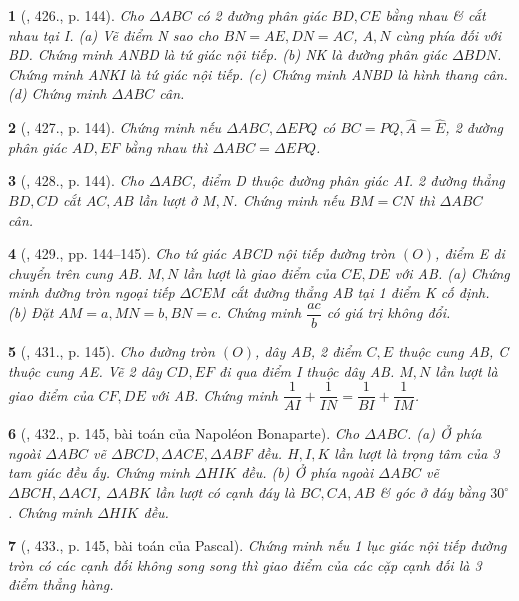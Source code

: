 \documentclass{article}
\newtheorem{baitoan}{}
\begin{document}
\begin{baitoan}[\cite{Binh_Toan_9_tap_2}, 426., p. 144]
	Cho $\Delta ABC$ có 2 đường phân giác $BD,CE$ bằng nhau \& cắt nhau tại I. (a) Vẽ điểm N sao cho $BN = AE,DN = AC$, $A,N$ cùng phía đối với BD. Chứng minh ANBD là tứ giác nội tiếp. (b) NK là đường phân giác $\Delta BDN$. Chứng minh ANKI là tứ giác nội tiếp. (c) Chứng minh ANBD là hình thang cân. (d) Chứng minh $\Delta ABC$ cân.
\end{baitoan}

\begin{baitoan}[\cite{Binh_Toan_9_tap_2}, 427., p. 144]
	Chứng minh nếu $\Delta ABC,\Delta EPQ$ có $BC = PQ,\widehat{A} = \widehat{E}$, 2 đường phân giác $AD,EF$ bằng nhau thì $\Delta ABC = \Delta EPQ$.
\end{baitoan}

\begin{baitoan}[\cite{Binh_Toan_9_tap_2}, 428., p. 144]
	Cho $\Delta ABC$, điểm D thuộc đường phân giác AI. 2 đường thẳng $BD,CD$ cắt $AC,AB$ lần lượt ở $M,N$. Chứng minh nếu $BM = CN$ thì $\Delta ABC$ cân.
\end{baitoan}

\begin{baitoan}[\cite{Binh_Toan_9_tap_2}, 429., pp. 144--145]
	Cho tứ giác ABCD nội tiếp đường tròn $(O)$, điểm E di chuyển trên cung AB. $M,N$ lần lượt là giao điểm của $CE,DE$ với AB. (a) Chứng minh đường tròn ngoại tiếp $\Delta CEM$ cắt đường thẳng AB tại 1 điểm K cố định. (b) Đặt $AM = a,MN = b,BN = c$. Chứng minh $\dfrac{ac}{b}$ có giá trị không đổi.
\end{baitoan}

\begin{baitoan}[\cite{Binh_Toan_9_tap_2}, 431., p. 145]
	Cho đường tròn $(O)$, dây AB, 2 điểm $C,E$ thuộc cung AB, C thuộc cung AE. Vẽ 2 dây $CD,EF$ đi qua điểm I thuộc dây AB. $M,N$ lần lượt là giao điểm của $CF,DE$ với AB. Chứng minh $\dfrac{1}{AI} + \dfrac{1}{IN} = \dfrac{1}{BI} + \dfrac{1}{IM}$.
\end{baitoan}

\begin{baitoan}[\cite{Binh_Toan_9_tap_2}, 432., p. 145, bài toán của Napol\'eon Bonaparte]
	Cho $\Delta ABC$. (a) Ở phía ngoài $\Delta ABC$ vẽ $\Delta BCD,\Delta ACE,\Delta ABF$ đều. $H,I,K$ lần lượt là trọng tâm của 3 tam giác đều ấy. Chứng minh $\Delta HIK$ đều. (b) Ở phía ngoài $\Delta ABC$ vẽ $\Delta BCH,\Delta ACI$, $\Delta ABK$ lần lượt có cạnh đáy là $BC,CA,AB$ \& góc ở đáy bằng $30^\circ$. Chứng minh $\Delta HIK$ đều.
\end{baitoan}

\begin{baitoan}[\cite{Binh_Toan_9_tap_2}, 433., p. 145, bài toán của Pascal]
	Chứng minh nếu 1 lục giác nội tiếp đường tròn có các cạnh đối không song song thì giao điểm của các cặp cạnh đối là 3 điểm thẳng hàng.
\end{baitoan}


\printbibliography[heading=bibintoc]
\end{document}
